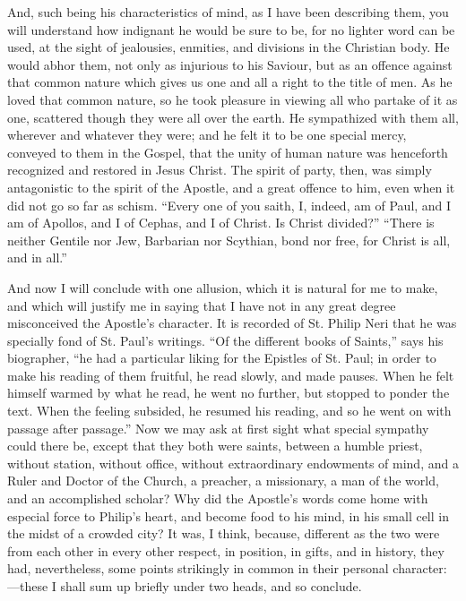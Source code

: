And, such being his characteristics of mind, as I have
been describing them, you will understand how indignant
he would be sure to be, for no lighter word can be used,
at the sight of jealousies, enmities, and divisions in the Christian body. He would abhor them, not only as
injurious to his Saviour, but as an offence against that
common nature which gives us one and all a right to the
title of men. As he loved that common nature, so he took
pleasure in viewing all who partake of it as one,
scattered though they were all over the earth. He
sympathized with them all, wherever and whatever they
were; and he felt it to be one special mercy, conveyed to
them in the Gospel, that the unity of human nature was
henceforth recognized and restored in Jesus Christ. The
spirit of party, then, was simply antagonistic to the
spirit of the Apostle, and a great offence to him, even
when it did not go so far as schism. ``Every one of
you saith, I, indeed, am of Paul, and I am of Apollos,
and I of Cephas, and I of Christ. Is Christ
divided?'' ``There is neither Gentile nor Jew,
Barbarian nor Scythian, bond nor free, for Christ is all,
and in all.''

And now I will conclude with one allusion, which it is
natural for me to make, and which will justify me in
saying that I have not in any great degree misconceived
the Apostle's character. It is recorded of St. Philip
Neri that he was specially fond of St. Paul's writings.
``Of the different books of Saints,'' says his
biographer, ``he had a particular liking for the
Epistles of St. Paul; in order to make his reading of
them fruitful, he read slowly, and made pauses. When he
felt himself warmed by what he read, he went no further,
but stopped to ponder the text. When the feeling
subsided, he resumed his reading, and so he went on with
passage after passage.'' Now we may ask at first
sight what special sympathy could there be, except that
they both were saints, between a humble priest, without
station, without office, without extraordinary endowments
of mind, and a Ruler and Doctor of the Church, a
preacher, a missionary, a man of the world, and an
accomplished scholar? Why did the Apostle's words come
home with especial force to Philip's heart, and become
food to his mind, in his small cell in the midst of a
crowded city? It was, I think, because, different as the
two were from each other in every other respect, in
position, in gifts, and in history, they had,
nevertheless, some points strikingly in common in their
personal character:—these I shall sum up briefly
under two heads, and so conclude.


